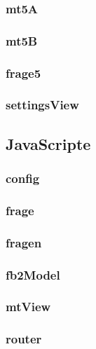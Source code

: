 \documentclass[a4paper]{scrartcl}
\begin{document}
				\subsubsection{mt5A}
					
				\subsubsection{mt5B}
					
				\subsubsection{frage5}
					
				\subsubsection{settingsView}
					
			\subsection{JavaScripte}
				\subsubsection{config}
					
				\subsubsection{frage}
					
				\subsubsection{fragen}
					
				\subsubsection{fb2Model}
					
				\subsubsection{mtView}
					
				\subsubsection{router}
					
\end{document}
